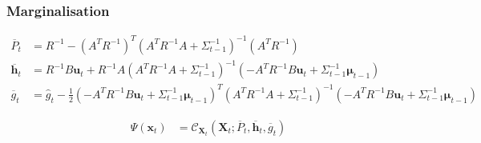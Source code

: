 \subsubsection{Marginalisation}
\label{subsubsection:marginalisation}

\begin{align}
\overline{P}_{t} &= R^{-1} - \left( A^{T} R^{-1} \right)^{T} \left( A^{T} R^{-1} A + \Sigma_{t-1}^{-1} \right)^{-1} \left( A^{T} R^{-1} \right) \\
\overline{\pmb{h}}_{t} &= R^{-1} B \pmb{u}_{t} + R^{-1}A \left(A^{T} R^{-1} A + \Sigma^{-1}_{t-1} \right)^{-1} \left( -A^{T} R^{-1} B \pmb{u}_{t} + \Sigma^{-1}_{t-1} \pmb{\mu}_{t-1} \right) \\
\overline{g}_{t} &= \hat{g}_{t} -\frac{1}{2} \left( -A^{T} R^{-1} B \pmb{u}_{t} + \Sigma^{-1}_{t-1} \pmb{\mu}_{t-1} \right)^{T} \left(A^{T} R^{-1} A + \Sigma^{-1}_{t-1} \right)^{-1} \left( -A^{T} R^{-1} B \pmb{u}_{t} + \Sigma^{-1}_{t-1} \pmb{\mu}_{t-1} \right) \nonumber
\end{align}

\begin{align}
\Psi({\pmb{x}_{t}}) &= \mathcal{C}_{\pmb{X}_{t}} \left( \pmb{X}_{t}; \overline{P}_t, \overline{\pmb{h}}_{t}, \overline{g}_{t} \right)
\end{align}

